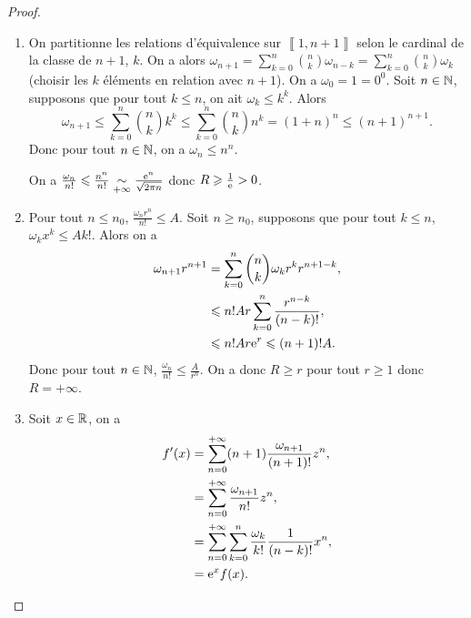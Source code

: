 \documentclass[12pt]{article}
\begin{document}
\begin{proof}
    \phantom{}
    \begin{enumerate}
        \item On partitionne les relations d'équivalence sur $\left\llbracket1,n+1\right\rrbracket$ selon le cardinal de la classe de $n+1$, $k$. On a alors $\omega_{n+1}=\sum_{k=0}^{n}\binom{n}{k}\omega_{n-k}=\sum_{k=0}^{n}\binom{n}{k}\omega_k$ (choisir les $k$ éléments en relation avec $n+1$). On a $\omega_{0}=1=0^{0}$. Soit $n\in\mathbb{N}$, supposons que pour tout $k\leqslant n$, on ait $\omega_{k}\leqslant k^{k}$. Alors 
        \begin{equation}
            \omega_{n+1}\leqslant\sum_{k=0}^{n}\binom{n}{k}k^{k}\leqslant\sum_{k=0}^{n}\binom{n}{k}n^{k}=(1+n)^{n}\leqslant(n+1)^{n+1}.
        \end{equation}
        Donc pour tout $n\in\mathbb{N}$, on a $\omega_{n}\leqslant n^{n}$.

        On a $\frac{\omega_{n}}{n!}\leqslant\frac{n^{n}}{n!}\underset{+\infty}{\sim}\frac{\mathrm{e}^{n}}{\sqrt{2\pi n}}$ donc $R\geqslant\frac{1}{\mathrm{e}}>0$.

        \item Pour tout $n\leqslant n_0$, $\frac{\omega_n r^{n}}{n!}\leqslant A$. Soit $n\geqslant n_0$, supposons que pour tout $k\leqslant n$, $\omega_k x^{k}\leqslant Ak!$. Alors on a 
        \begin{align}
            \omega_{n+1}r^{n+1}
            &=\sum_{k=0}^{n}\binom{n}{k}\omega_{k}r^{k}r^{n+1-k},\\
            &\leqslant n!Ar\sum_{k=0}^{n}\frac{r^{n-k}}{(n-k)!},\\
            &\leqslant n! A r\mathrm{e}^{r}\leqslant (n+1)! A.
        \end{align}
        Donc pour tout $n\in\mathbb{N}$, $\frac{\omega_n}{n!}\leqslant \frac{A}{r^{n}}$. On a donc $R\geqslant r$ pour tout $r\geqslant 1$ donc $R=+\infty$.

        \item Soit $x\in\mathbb{R}$, on a 
        \begin{align}
            f'(x)
            &=\sum_{n=0}^{+\infty}(n+1)\frac{\omega_{n+1}}{(n+1)!}z^{n},\\
            &=\sum_{n=0}^{+\infty}\frac{\omega_{n+1}}{n!}z^{n},\\
            &=\sum_{n=0}^{+\infty}\sum_{k=0}^{n}\frac{\omega_{k}}{k!}\frac{1}{(n-k)!}x^{n},\\
            &=\mathrm{e}^{x}f(x).
        \end{align}


\end{enumerate}
\end{proof}
\end{document}
